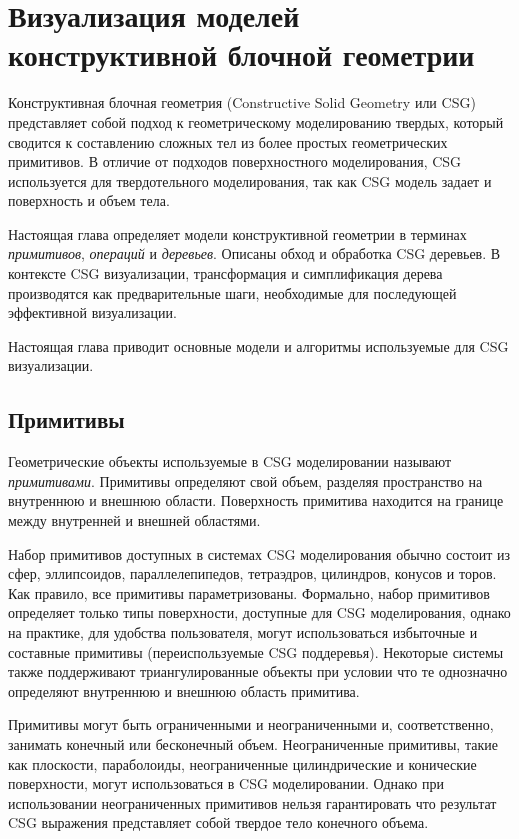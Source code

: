 \chapter{Визуализация моделей конструктивной блочной геометрии} \label{chapt2}

Конструктивная блочная геометрия (Constructive Solid Geometry или CSG) \cite{Requicha80} представляет собой подход к геометрическому моделированию твердых, который сводится к составлению сложных тел из более простых геометрических примитивов. В отличие от подходов поверхностного моделирования, CSG используется для твердотельного моделирования, так как CSG модель задает и поверхность и объем тела.

Настоящая глава определяет модели конструктивной геометрии в терминах \textit{примитивов}, \textit{операций} и \textit{деревьев}. Описаны обход и обработка CSG деревьев. В контексте CSG визуализации, трансформация и симплификация дерева производятся как предварительные шаги, необходимые для последующей эффективной визуализации.

Настоящая глава приводит основные модели и алгоритмы используемые для CSG визуализации.


\section{Примитивы} \label{sect_primitives}

Геометрические объекты используемые в CSG моделировании называют \textit{примитивами}. Примитивы определяют свой объем, разделяя пространство на внутреннюю и внешнюю области. Поверхность примитива находится на границе между внутренней и внешней областями.

Набор примитивов доступных в системах CSG моделирования обычно состоит из сфер, эллипсоидов, параллелепипедов, тетраэдров, цилиндров, конусов и торов. Как правило, все примитивы параметризованы. Формально, набор примитивов определяет только типы поверхности, доступные для CSG моделирования, однако на практике, для удобства пользователя, могут использоваться избыточные и составные примитивы (переиспользуемые CSG поддеревья).  Некоторые системы также поддерживают триангулированные объекты при условии что те однозначно определяют внутреннюю и внешнюю область примитива.


Примитивы могут быть ограниченными и неограниченными и, соответственно, занимать конечный или бесконечный объем. Неограниченные примитивы, такие как плоскости, параболоиды, неограниченные цилиндрические и конические поверхности, могут использоваться в CSG моделировании. Однако при использовании неограниченных примитивов нельзя гарантировать что результат CSG выражения представляет собой твердое тело конечного объема.


